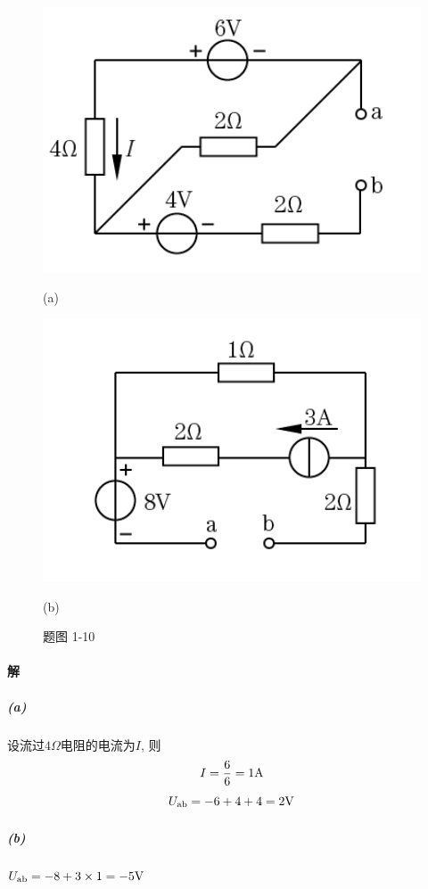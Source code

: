 \documentclass[hyperref, UTF8]{ctexart}
\begin{document}
\begin{figure}[!htb]
  \centering
  \begin{minipage}[t]{0.261\textwidth}
    \centering
    \includegraphics[width=1\textwidth]{p1-10-a.png}
    \caption*{(a)}
  \end{minipage}
  \begin{minipage}[t]{0.264\textwidth}
    \centering
    \includegraphics[width=1\textwidth]{p1-10-b.png}
    \caption*{(b)}
  \end{minipage}
  \caption*{题图 1-10}
\end{figure}

\paragraph{解}
\subparagraph{(a)}
设流过$4\Omega$电阻的电流为$I$, 则
$$I=\frac{6}{6}=1{\rm A} $$
$$U_{\rm ab}=-6+4+4=2{\rm V}$$
\subparagraph{(b)}
$U_{\rm ab}=-8+3\times 1=-5{\rm V}$
\end{document}
